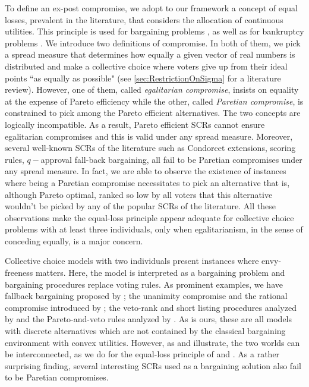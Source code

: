 \documentclass[version=3.21, pagesize, twoside=off, bibliography=totoc, DIV=calc, fontsize=12pt, a4paper]{scrartcl}
\begin{document}
To define an ex-post compromise, we adopt to our framework a concept of equal losses, prevalent in the literature, that considers the allocation of continuous utilities. This principle is used for bargaining problems \citep{Chun1988}, \citep{Chun1991} as well as for bankruptcy problems \citep{Herrero2001}. 
We introduce two definitions of compromise. In both of them, we pick a spread measure that determines how equally a given vector of real numbers is distributed and make a collective choice where voters give up from their ideal points “as equally as possible" (see \cref{sec:RestrictionOnSigma} for a literature review). However, one of them, called \textit{egalitarian compromise}, insists on equality at the expense of Pareto efficiency while the other, called \textit{Paretian compromise}, is constrained to pick among the Pareto efficient alternatives. 
The two concepts are logically incompatible. As a result, Pareto efficient \acp{SCR} cannot ensure egalitarian compromises and this is valid under any spread measure. Moreover, several well-known \acp{SCR} of the literature such as Condorcet extensions, scoring rules, $q-$approval fall-back bargaining, all fail to be Paretian compromises under any spread measure. In fact, we are able to observe the existence of instances where being a Paretian compromise necessitates to pick an alternative that is, although Pareto optimal, ranked so low by all voters that this alternative wouldn't be picked by any of the popular \acp{SCR} of the literature. All these observations make the equal-loss principle appear adequate for collective choice problems with at least three individuals, only when egalitarianism, in the sense of conceding equally, is a major concern. 

Collective choice models with two individuals present instances where envy-freeness matters. Here, the model is interpreted as a bargaining problem and bargaining procedures replace voting rules. As prominent examples, we have fallback bargaining proposed by \citet{Brams2001}; the unanimity compromise and the rational compromise introduced by \citet{Kibris2007}; the veto-rank and short listing procedures analyzed by \citet{Clippel2014} and the Pareto-and-veto rules analyzed by \citet{Laslier2020}. As is ours, these are all models with discrete alternatives which are not contained by the classical \citet{Nash1950} bargaining environment with convex utilities. However, as \citet{Mariotti1998} and \citet{Nagahisa2002} illustrate, the two worlds can be interconnected, as we do for the equal-loss principle of \citet{Chun1988} and \citet{Chun1991}. As a rather surprising finding, several interesting \acp{SCR} used as a bargaining solution also fail to be Paretian compromises.
\end{document}
